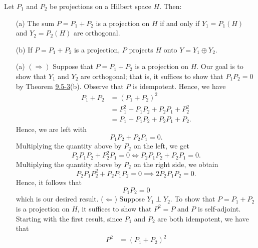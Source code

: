 \begin{theorem}
    Let \( {P}_{1} \) and \( {P}_{2} \) be projections on a Hilbert space \( H  \). Then:
    \begin{enumerate}
    \item[(a)] The sum \( P = {P}_{1} + {P}_{2} \) is a projection on \( H  \) if and only if \( {Y}_{1} = {P}_{1}(H) \) and \( {Y}_{2} = {P}_{2}(H) \) are orthogonal.
    \item[(b)] If \( P = {P}_{1} + {P}_{2}  \) is a projection, \( P  \) projects \( H \) onto \( Y = {Y}_{1} \oplus {Y}_{2} \). 
    \end{enumerate}
\end{theorem}
\begin{enumerate}
    \item[(a)] \( (\Longrightarrow) \) Suppose that \( P =  {P}_{1} + {P}_{2}  \) is a projection on \( H  \). Our goal is to show that \( {Y}_{1} \) and \( {Y}_{2}  \) are orthogonal; that is, it suffices to show that \( {P}_{1} {P}_{2} = 0  \) by Theorem {\hyperref[9.5-3]{9.5-3}}(b). Observe that \( P  \) is idempotent. Hence, we have  
        \begin{align*}
            {P}_{1} + {P}_{2} &= ({P}_{1} + {P}_{2})^{2} \\
                              &= {P}_{1}^{2} + {P}_{1} {P}_{2} + {P}_{2} {P}_{1} + {P}_{2}^{2} \\
                              &= {P}_{1} + {P}_{1} {P}_{2} + {P}_{2} {P}_{1}  +{P}_{2}.
        \end{align*}
        Hence, we are left with 
        \[  {P}_{1}{P}_{2} + {P}_{2} {P}_{1} = 0.  \]
        Multiplying the quantity above by \( {P}_{2}  \) on the left, we get 
        \[  {P}_{2} {P}_{1} {P}_{2} + {P}_{2}^{2} {P}_{1} = 0 \iff {P}_{2} {P}_{1} {P}_{2} + {P}_{2} {P}_{1} = 0. \]
        Multiplying the quantity above by \( {P}_{2} \) on the right side, we obtain
        \[  {P}_{2} {P}_{1} {P}_{2}^{2} + {P}_{2} {P}_{1} {P}_{2} = 0 \implies 2{P}_{2} {P}_{1} {P}_{2} = 0.    \]
        Hence, it follows that 
        \[  {P}_{1}{P}_{2} = 0  \]
        which is our desired result.
        (\( \Longleftarrow \)) Suppose \( {Y}_{1} \perp {Y}_{2} \). To show that \( P = {P}_{1} + {P}_{2} \) is a projection on \( H  \), it suffices to show that \( P^{2} = P  \) and \( P  \) is self-adjoint. Starting with the first result, since \( {P}_{1} \) and \( {P}_{2} \) are both idempotent, we have that 
        \begin{align*}
            P^{2} &= ({P}_{1} + {P}_{2})^{2} \\

\end{align*}
\end{enumerate}
